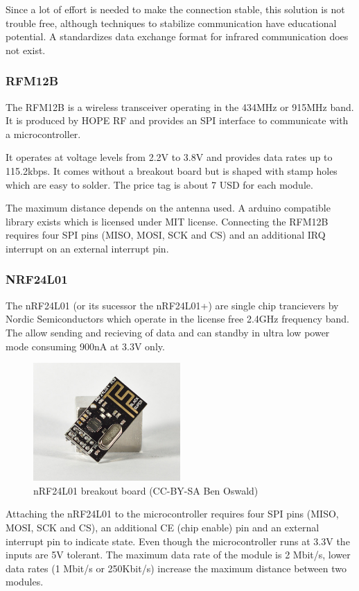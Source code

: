 \documentclass[11pt,a4paper]{article}
\begin{document}
Since a lot of effort is needed to make the connection stable, this solution is not trouble free, although techniques to stabilize communication have educational potential. A standardizes data exchange format for infrared communication does not exist.

\subsubsection{RFM12B}
The RFM12B is a wireless transceiver operating in the 434MHz or 915MHz band. It is produced by HOPE RF and provides an SPI interface to communicate with a microcontroller. 

It operates at voltage levels from 2.2V to 3.8V and provides data rates up to 115.2kbps. It comes without a breakout board but is shaped with stamp holes which are easy to solder. The price tag is about 7 USD for each module.

The maximum distance depends on the antenna used. A arduino compatible library exists which is licensed under MIT license. Connecting the RFM12B requires four SPI pins (MISO, MOSI, SCK and CS) and an additional IRQ interrupt on an external interrupt pin.
\subsubsection{NRF24L01}
The nRF24L01 (or its sucessor the nRF24L01+) are single chip trancievers by Nordic Semiconductors which operate in the license free 2.4GHz frequency band. The allow sending and recieving of data and can standby in ultra low power mode consuming 900nA at 3.3V only.

\begin{figure}[h!]
  \centering
  \includegraphics[width=0.5\textwidth]{images/30_nrf24l01.jpg}
  \caption{nRF24L01 breakout board (CC-BY-SA Ben Oswald)}
\end{figure}

Attaching the nRF24L01 to the microcontroller requires four SPI pins (MISO, MOSI, SCK and CS), an additional CE (chip enable) pin and an external interrupt pin to indicate state. Even though the microcontroller runs at 3.3V the inputs are 5V tolerant. The maximum data rate of the module is 2 Mbit/s, lower data rates (1 Mbit/s or 250Kbit/s) increase the maximum distance between two modules.
\end{document}
